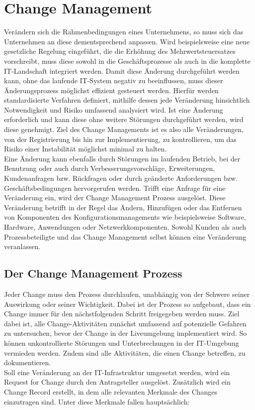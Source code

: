 \chapter{Change Management}
Verändern sich die Rahmenbedingungen eines Unternehmens, so muss sich das Unternehmen an diese dementsprechend anpassen. Wird beispielsweise eine neue gesetzliche Regelung eingeführt, die die Erhöhung des Mehrwertsteuersatzes vorschreibt, muss diese sowohl in die Geschäftsprozesse als auch in die komplette IT-Landschaft integriert werden. Damit diese Änderung durchgeführt werden kann, ohne das laufende IT-System negativ zu beeinflussen, muss dieser Änderungsprozess möglichst effizient gesteuert werden. Hierfür werden standardisierte Verfahren definiert, mithilfe dessen jede Veränderung hinsichtlich Notwendigkeit und Risiko umfassend analysiert wird. Ist eine Änderung erforderlich und kann diese ohne weitere Störungen durchgeführt werden, wird diese genehmigt. Ziel des Change Managements ist es also alle Veränderungen, von der Registrierung bis hin zur Implementierung, zu kontrollieren, um das Risiko einer Instabilität möglichst minimal zu halten.
\\
Eine Änderung kann ebenfalls durch Störungen im laufenden Betrieb, bei der Benutzung oder auch durch Verbesserungsvorschläge, Erweiterungen, Kundenanfragen bzw. Rückfragen oder durch geänderte Anforderungen bzw. Geschäftsbedingungen hervorgerufen werden. 
Trifft eine Anfrage für eine Veränderung ein, wird der Change Management Prozess ausgelöst. Diese Veränderung betrifft in der Regel das Ändern, Hinzufügen oder das Entfernen von Komponenten des Konfigurationsmanagements wie beispielsweise Software, Hardware, Anwendungen oder Netzwerkkomponenten. Sowohl Kunden als auch Prozessbeteiligte und das Change Management selbst können eine Veränderung veranlassen. 

\section{Der Change Management Prozess}
Jeder Change muss den Prozess durchlaufen, unabhängig von der Schwere  seiner Auswirkung oder seiner Wichtigkeit. Dabei ist der Prozess so aufgebaut, dass ein Change immer für den nächstfolgenden Schritt freigegeben werden muss. 
Ziel dabei ist, alle Change-Aktivitäten zunächst umfassend auf potenzielle Gefahren zu untersuchen, bevor der Change in der Liveumgebung implementiert wird. So können unkontrollierte Störungen und Unterbrechungen in der IT-Umgebung vermieden werden.
Zudem sind alle Aktivitäten, die einen Change betreffen, zu dokumentieren. 
\\
Soll eine Veränderung an der IT-Infrastruktur umgesetzt werden, wird ein Request for Change durch den Antragsteller ausgelöst. Zusätzlich wird ein Change Record erstellt, in dem alle relevanten Merkmale des Changes einzutragen sind. Unter diese Merkmale fallen hauptsächlich:

